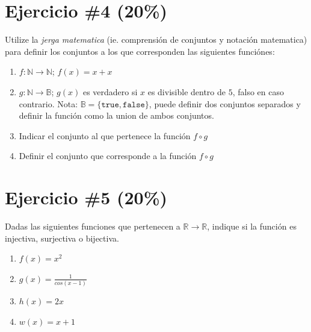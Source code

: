 \documentclass{article}
\begin{document}
\section*{Ejercicio \#4 (20\%)}
Utilize la \emph{jerga matematica} (ie. comprensi\'on de conjuntos y notaci\'on matematica) para definir los conjuntos a los que corresponden las
siguientes funci\'ones:
\begin{enumerate}
        \item{$f:\mathbb{N}\rightarrow\mathbb{N}$; $f(x)=x+x$}
        \item{$g:\mathbb{N}\rightarrow\mathbb{B}$; $g(x)$ es verdadero si
        $x$ es divisible dentro de $5$, falso en caso contrario. Nota: $\mathbb{B}=
        \{\mathtt{true},\mathtt{false}\}$, puede definir dos conjuntos separados y
        definir la funci\'on como la union de ambos conjuntos.}
        \item{Indicar el conjunto al que pertenece la funci\'on $f\circ g$}
        \item{Definir el conjunto que corresponde a la funci\'on $f\circ g$}
\end{enumerate}

\section*{Ejercicio \#5 (20\%)}
Dadas las siguientes funciones que pertenecen a $\mathbb{R}\rightarrow \mathbb{R}$, indique
si la funci\'on es injectiva, surjectiva o bijectiva.
\begin{enumerate}
        \item{$f(x)=x^2$}
        \item{$g(x)=\frac{1}{cos(x-1)}$}
        \item{$h(x)=2x$}
        \item{$w(x)=x+1$}
\end{enumerate}
\end{document}
